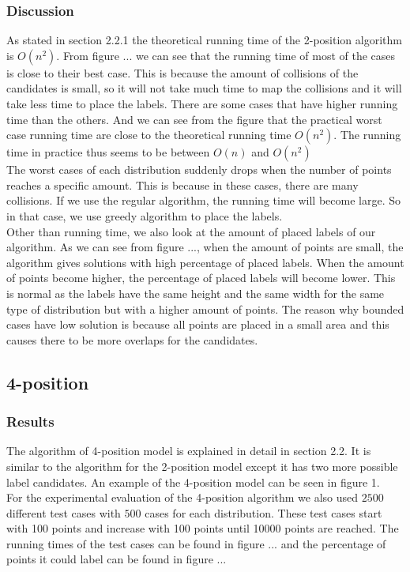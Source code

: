 \documentclass[crop=false,a4paper,oneside,11pt]{standalone}
\begin{document}
\subsubsection{Discussion}
As stated in section 2.2.1 the theoretical running time of the 2-position algorithm is $O(n^2)$. From figure ... we can see that the running time of most of the cases is close to their best case. This is because the amount of collisions of the candidates is small, so it will not take much time to map the collisions and it will take less time to place the labels. There are some cases that have higher running time than the others. And we can see from the figure that the practical worst case running time are close to the theoretical running time $O(n^2)$. The running time in practice thus seems to be between $O(n)$ and $O(n^2)$ \\
The worst cases of each distribution suddenly drops when the number of points reaches a specific amount. This is because in these cases, there are many collisions. If we use the regular algorithm, the running time will become large. So in that case, we use greedy algorithm to place the labels.\\
Other than running time, we also look at the amount of placed labels of our algorithm. As we can see from figure ..., when the amount of points are small, the algorithm gives solutions with high percentage of placed labels. When the amount of points become higher, the percentage of placed labels will become lower. This is normal as the labels have the same height and the same width for the same type of distribution but with a higher amount of points. The reason why bounded cases have low solution is because all points are placed in a small area and this causes there to be more overlaps for the candidates.\\


\subsection{4-position}
\subsubsection{Results}
The algorithm of 4-position model is explained in detail in section 2.2. It is similar to the algorithm for the 2-position model except it has two more possible label candidates. An example of the 4-position model can be seen in figure 1.\\
 For the experimental evaluation of the 4-position algorithm we also used $2500$ different test cases with $500$ cases for each distribution. These test cases start with 100 points and increase with 100 points until 10000 points are reached. The running times of the test cases can be found in figure ... and the percentage of points it could label can be found in figure ...\\
\end{document}
